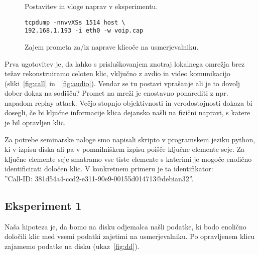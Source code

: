 \documentclass{acm_proc_article-sp}
\begin{document}
\begin{figure}
\centering
{} %
\caption{Postavitev in vloge naprav v eksperimentu.}
\label{fig:setup}
\end{figure}

\begin{figure}
\centering
\begin{verbatim}
tcpdump -nnvvXSs 1514 host \
192.168.1.193 -i eth0 -w voip.cap
\end{verbatim}
\caption{Zajem prometa za/iz naprave klicoče na usmerjevalniku.}
\label{fig:tcpdump}
\end{figure}

Prva ugotovitev je, da lahko s prisluškovanjem znotraj loka\-lnega omrežja brez težav rekonstruiramo celoten klic, vključno z avdio in video komunikacijo (sliki~\ref{fig:call} in ~\ref{fig:audio}). Vendar se tu postavi vprašanje ali je to dovolj dober dokaz na sodišču? Promet na mreži je enostavno ponarediti z npr. napadom replay attack. Večjo stopnjo objektivnosti in verodostojnosti dokaza bi dosegli, če bi ključne informacije klica dejansko našli na fizični napravi, s katere je bil opravljen klic.

\begin{figure*}
\centering
{} %
\caption{Vzpostavitev in potek klica.}
\label{fig:call}
\end{figure*}

\begin{figure*}
\centering
{} %
\caption{Rekonstrukcija zvočnega zapisa s programom wireshark.}
\label{fig:audio}
\end{figure*}

Za potrebe seminarske naloge smo napisali skripto v programskem jeziku python, ki v izpisu diska ali pa v pomnilniškem izpisu poišče ključne elemente seje. Za ključne elemente seje smatramo vse tiste elemente s katerimi je mogoče enolično identificirati določen klic. V konkretnem primeru je ta identifikator:
\\
''Call-ID: 381d54a4-ccd2-e311-90e9-00155d014713@debian32''.

\subsection{Eksperiment 1}

Naša hipoteza je, da bomo na disku odjemalca našli podatke, ki bodo enolično določili klic med vsemi podatki zajetimi na usmerjevalniku. Po opravljenem klicu zajamemo podatke na disku (ukaz~\ref{fig:dd}).
\end{document}
